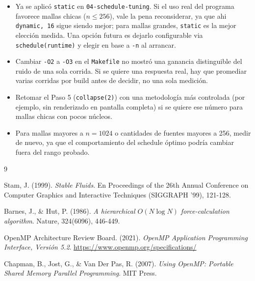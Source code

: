 \documentclass[11pt]{article}
\begin{document}
\begin{itemize}
    \item Ya se aplicó \texttt{static} en \texttt{04-schedule-tuning}. Si
        el uso real del programa favorece mallas chicas ($n \leq 256$),
        vale la pena reconsiderar, ya que ahi \texttt{dynamic, 16} sigue
        siendo mejor; para mallas grandes, \texttt{static} es la mejor
        elección medida. Una opción futura es dejarlo configurable via
        \texttt{schedule(runtime)} y elegir en base a \texttt{-n} al
        arrancar.
    \item Cambiar \texttt{-O2} a \texttt{-O3} en el \texttt{Makefile} no
        mostró una ganancia distinguible del ruido de una sola corrida.
        Si se quiere una respuesta real, hay que promediar varias
        corridas por build antes de decidir, no una sola medición.
    \item Retomar el Paso 5 (\texttt{collapse(2)}) con una metodología más
        controlada (por ejemplo, sin renderizado en pantalla completa) si
        se quiere ese número para mallas chicas con pocos núcleos.
    \item Para mallas mayores a $n=1024$ o cantidades de fuentes mayores a
        256, medir de nuevo, ya que el comportamiento del schedule óptimo podría
        cambiar fuera del rango probado.
\end{itemize}

\newpage

\begin{thebibliography}{9}

Stam, J. (1999). \emph{Stable Fluids}. En Proceedings of the 26th Annual
Conference on Computer Graphics and Interactive Techniques (SIGGRAPH '99),
121-128.

Barnes, J., \& Hut, P. (1986). \emph{A hierarchical $O(N \log N)$
force-calculation algorithm}. Nature, 324(6096), 446-449.

OpenMP Architecture Review Board. (2021). \emph{OpenMP Application
Programming Interface, Versión 5.2}.
\url{https://www.openmp.org/specifications/}

Chapman, B., Jost, G., \& Van Der Pas, R. (2007). \emph{Using OpenMP:
Portable Shared Memory Parallel Programming}. MIT Press.

\end{thebibliography}
\end{document}
